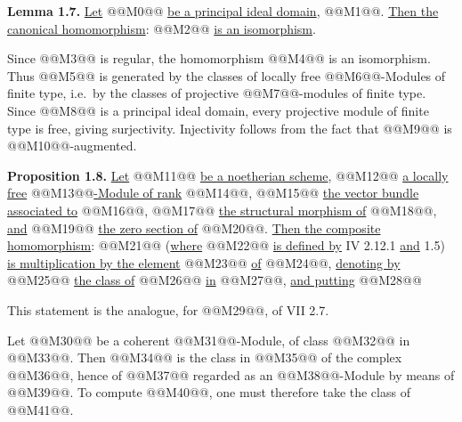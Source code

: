 \textbf{Lemma 1.7.} \uline{Let} @@M0@@ \uline{be a principal ideal domain}, @@M1@@. \uline{Then the canonical homomorphism}:
@@M2@@
\uline{is an isomorphism}.

Since @@M3@@ is regular, the homomorphism @@M4@@ is an isomorphism. Thus @@M5@@ is generated by the classes of locally free @@M6@@-Modules of finite type, i.e.\ by the classes of projective @@M7@@-modules of finite type. Since @@M8@@ is a principal ideal domain, every projective module of finite type is free, giving surjectivity. Injectivity follows from the fact that @@M9@@ is @@M10@@-augmented.

\textbf{Proposition 1.8.} \uline{Let} @@M11@@ \uline{be a noetherian scheme}, @@M12@@ \uline{a locally free} @@M13@@\uline{-Module of rank} @@M14@@, @@M15@@ \uline{the vector bundle associated to} @@M16@@, @@M17@@ \uline{the structural morphism of} @@M18@@, \uline{and} @@M19@@ \uline{the zero section of} @@M20@@. \uline{Then the composite homomorphism}:
@@M21@@
(\uline{where} @@M22@@ \uline{is defined by} IV 2.12.1 \uline{and} 1.5) \uline{is multiplication by the element} @@M23@@ \uline{of} @@M24@@, \uline{denoting by} @@M25@@ \uline{the class of} @@M26@@ \uline{in} @@M27@@, \uline{and putting}
@@M28@@

This statement is the analogue, for @@M29@@, of VII 2.7.

Let @@M30@@ be a coherent @@M31@@-Module, of class @@M32@@ in @@M33@@. Then @@M34@@ is the class in @@M35@@ of the complex @@M36@@, hence of @@M37@@ regarded as an @@M38@@-Module by means of @@M39@@. To compute @@M40@@, one must therefore take the class of @@M41@@.
